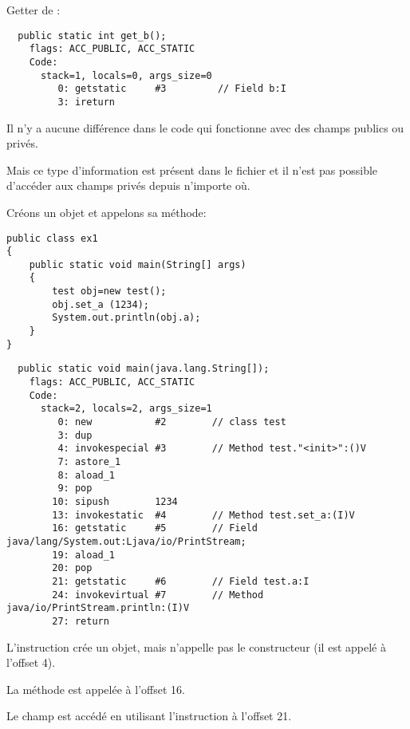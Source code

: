 Getter de :

\begin{lstlisting}
  public static int get_b();
    flags: ACC_PUBLIC, ACC_STATIC
    Code:
      stack=1, locals=0, args_size=0
         0: getstatic     #3         // Field b:I
         3: ireturn
\end{lstlisting}

Il n'y a aucune différence dans le code qui fonctionne avec des champs publics ou
privés.

Mais ce type d'information est présent dans le fichier  et il n'est pas
possible d'accéder aux champs privés depuis n'importe où.


Créons un objet et appelons sa méthode:


\begin{lstlisting}[caption=ex1.java,style=customjava]
public class ex1
{
	public static void main(String[] args)
	{
		test obj=new test();
		obj.set_a (1234);
		System.out.println(obj.a);
	}
}
\end{lstlisting}

\begin{lstlisting}
  public static void main(java.lang.String[]);
    flags: ACC_PUBLIC, ACC_STATIC
    Code:
      stack=2, locals=2, args_size=1
         0: new           #2        // class test
         3: dup
         4: invokespecial #3        // Method test."<init>":()V
         7: astore_1
         8: aload_1
         9: pop
        10: sipush        1234
        13: invokestatic  #4        // Method test.set_a:(I)V
        16: getstatic     #5        // Field java/lang/System.out:Ljava/io/PrintStream;
        19: aload_1
        20: pop
        21: getstatic     #6        // Field test.a:I
        24: invokevirtual #7        // Method java/io/PrintStream.println:(I)V
        27: return
\end{lstlisting}

L'instruction  crée un objet, mais n'appelle pas le constructeur (il est
appelé à l'offset 4).

La méthode  est appelée à l'offset 16.

Le champ  est accédé en utilisant l'instruction  à l'offset 21.

